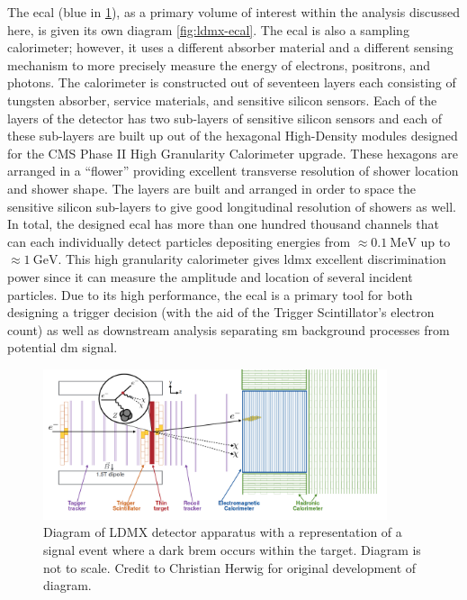 The \ac{ecal} (blue in \cref{fig:ldmx-det}), as a primary volume of interest within the analysis
discussed here, is given its own diagram \cref{fig:ldmx-ecal}. The \ac{ecal} is also a sampling
calorimeter; however, it uses a different absorber material and a different sensing mechanism to
more precisely measure the energy of electrons, positrons, and photons. The calorimeter is
constructed out of seventeen layers each consisting of tungsten absorber, service materials, and
sensitive silicon sensors. Each of the layers of the detector has two sub-layers of sensitive
silicon sensors and each of these sub-layers are built up out of the hexagonal High-Density modules
designed for the CMS Phase II High Granularity Calorimeter upgrade\cite{cms-phase-2-tdr}. These
hexagons are arranged in a ``flower'' providing excellent transverse resolution of shower location
and shower shape. The layers are built and arranged in order to space the sensitive silicon
sub-layers to give good longitudinal resolution of showers as well. In total, the designed
\ac{ecal} has more than one hundred thousand channels that can each individually detect particles
depositing energies from $\approx \qty{0.1}{\mega\electronvolt}$ up to
$\approx\qty{1}{\giga\electronvolt}$.
This high granularity calorimeter gives \ac{ldmx} excellent discrimination power since it can
measure the amplitude and location of several incident particles. Due to its high performance, the \ac{ecal} is a primary tool for both
designing a trigger decision (with the aid of the Trigger Scintillator's electron count) as well as
downstream analysis separating \ac{sm} background processes from potential \ac{dm} signal.

\begin{figure}
  \centering
  \includegraphics[width=0.9\textwidth]{figures/ldmx/experiment/detector.png}
  \caption{
    Diagram of LDMX detector apparatus with a representation of a signal event where
    a dark brem occurs within the target. Diagram is not to scale. Credit to Christian Herwig
    for original development of diagram.
  }
  \label{fig:ldmx-det}
\end{figure}

